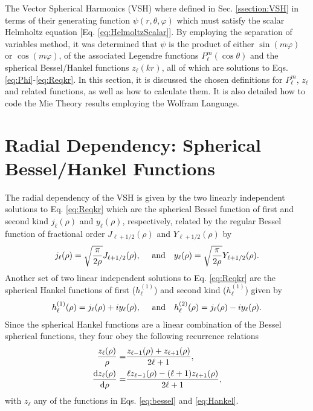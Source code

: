 
The Vector Spherical Harmonics (VSH) where defined in Sec. \ref{ssection:VSH} in terms of their generating function $\psi(r,\theta,\varphi)$ which must satisfy the scalar Helmholtz equation [Eq.  \eqref{eq:HelmoltzScalar}]. By employing the separation of variables method,  it was determined that $\psi$ is the product of either $\sin(m\varphi)$ or $\cos(m\varphi)$, of the associated Legendre functions $P_\ell^m(\cos\theta)$ and the spherical Bessel/Hankel functions $z_\ell(kr)$, all of which are solutions to Eqs. \eqref{eq:Phi}-\eqref{eq:Reqkr}. In this section, it is discussed the chosen definitions for $P_\ell^m$, $z_\ell$ and related functions, as well as how to calculate them. It is also detailed how to code the Mie Theory results employing the Wolfram Language.

\section*{Radial Dependency: Spherical Bessel/Hankel Functions}

The radial dependency of the VSH is given by the two linearly independent solutions to Eq. \eqref{eq:Reqkr} which are the spherical Bessel function of first and second kind $j_\ell(\rho)$ and $y_\ell(\rho)$, respectively, related by the regular Bessel function of fractional order $J_{\ell+1/2}(\rho)$ and  $Y_{\ell+1/2}(\rho)$ by
%
\begin{align}
j_\ell(\rho) = \sqrt{\frac{\pi}{2 \rho}}J_{\ell+1/2}(\rho),\qqtext{ and}
y_\ell(\rho) = \sqrt{\frac{\pi}{2\rho}}Y_{\ell+1/2}(\rho).
\label{eq:bessel}
\end{align}
%
Another set of two linear independent solutions to  Eq. \eqref{eq:Reqkr} are the spherical Hankel functions  of first ($h^{(1)}_\ell$)  and second kind ($h^{(1)}_\ell$) given by
\begin{align}
h^{(1)}_\ell(\rho) = j_\ell(\rho) + i y_\ell(\rho),\qqtext{ and}
h^{(2)}_\ell(\rho) = j_\ell(\rho) - i y_\ell(\rho).
\label{eq:Hankel}
\end{align}
%
Since the spherical Hankel functions are a linear combination of the Bessel spherical functions, they four obey the following recurrence relations
%
\begin{align}
\frac{z_\ell(\rho)}{\rho} =& \frac{z_{\ell-1}(\rho) + z_{\ell+1}(\rho)}{2\ell + 1},
\label{eq:recBessel1}\\
\dv{z_\ell(\rho)}{\rho} =& \frac{\ell z_{\ell-1}(\rho) - (\ell+1)z_{\ell+1}(\rho)}{2\ell + 1} ,
\label{eq:recBessel2}
\end{align}
%
with $z_\ell$ any of the functions in Eqs. \eqref{eq:bessel} and \eqref{eq:Hankel}.


